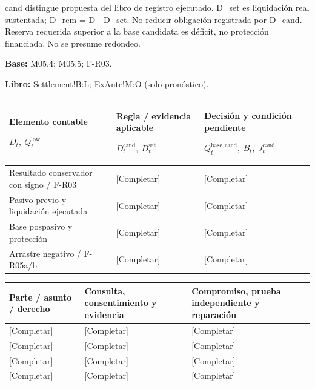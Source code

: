 cand distingue propuesta del libro de registro ejecutado. D\_set es liquidación real sustentada; D\_rem = D - D\_set. No reducir obligación registrada por D\_cand. Reserva requerida superior a la base candidata es déficit, no protección financiada. No se presume redondeo.\par
\textbf{Base:} M05.4; M05.5; F-R03.\par
\textbf{Libro:} Settlement!B:L; ExAnte!M:O (solo pronóstico).\par\endgroup
{\sffamily\fontsize{8.3}{10.3}\selectfont\begin{longtable}{@{}P{64.34mm} P{49.49mm} P{51.14mm}@{}}
\toprule
\textbf{Elemento contable}\par {\normalfont\fontsize{8.2}{10}\selectfont $D_t,\ Q_t^{\mathrm{low}}$} & \textbf{Regla / evidencia aplicable}\par {\normalfont\fontsize{8.2}{10}\selectfont $D_t^{\mathrm{cand}},\ D_t^{\mathrm{set}}$} & \textbf{Decisión y condición pendiente}\par {\normalfont\fontsize{8.2}{10}\selectfont $Q_t^{\mathrm{base,cand}},\ B_t,\ J_t^{\mathrm{cand}}$}\\\midrule\endhead
\rule{0pt}{7.7mm}Resultado conservador con signo / F-R03 & [Completar] & [Completar]\\\hline
\rule{0pt}{7.7mm}Pasivo previo y liquidación ejecutada & [Completar] & [Completar]\\\hline
\rule{0pt}{7.7mm}Base pospasivo y protección & [Completar] & [Completar]\\\hline
\rule{0pt}{7.7mm}Arrastre negativo / F-R05a/b & [Completar] & [Completar]\\\hline
\end{longtable}}
{\sffamily\fontsize{8.3}{10.3}\selectfont\begin{longtable}{@{}P{47.84mm} P{57.74mm} P{59.39mm}@{}}
\toprule
\textbf{Parte / asunto / derecho} & \textbf{Consulta, consentimiento y evidencia} & \textbf{Compromiso, prueba independiente y reparación}\\\midrule\endhead
\rule{0pt}{7.7mm}[Completar] & [Completar] & [Completar]\\\hline
\rule{0pt}{7.7mm}[Completar] & [Completar] & [Completar]\\\hline
\rule{0pt}{7.7mm}[Completar] & [Completar] & [Completar]\\\hline
\rule{0pt}{7.7mm}[Completar] & [Completar] & [Completar]\\\hline
\end{longtable}}
